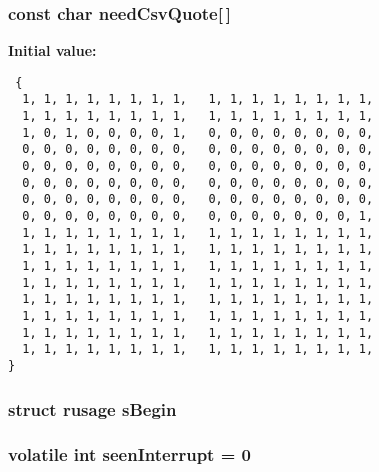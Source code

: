 \subsubsection{\setlength{\rightskip}{0pt plus 5cm}const char \bf{need\-Csv\-Quote}[$\,$]\hspace{0.3cm}{\tt  [static]}}\label{3_87_83_2shell_8c_2bf82b89bb4c95c96d328b320447072c}


\textbf{Initial value:}

\begin{Code}\begin{verbatim} {
  1, 1, 1, 1, 1, 1, 1, 1,   1, 1, 1, 1, 1, 1, 1, 1,   
  1, 1, 1, 1, 1, 1, 1, 1,   1, 1, 1, 1, 1, 1, 1, 1,   
  1, 0, 1, 0, 0, 0, 0, 1,   0, 0, 0, 0, 0, 0, 0, 0, 
  0, 0, 0, 0, 0, 0, 0, 0,   0, 0, 0, 0, 0, 0, 0, 0, 
  0, 0, 0, 0, 0, 0, 0, 0,   0, 0, 0, 0, 0, 0, 0, 0, 
  0, 0, 0, 0, 0, 0, 0, 0,   0, 0, 0, 0, 0, 0, 0, 0, 
  0, 0, 0, 0, 0, 0, 0, 0,   0, 0, 0, 0, 0, 0, 0, 0, 
  0, 0, 0, 0, 0, 0, 0, 0,   0, 0, 0, 0, 0, 0, 0, 1, 
  1, 1, 1, 1, 1, 1, 1, 1,   1, 1, 1, 1, 1, 1, 1, 1,   
  1, 1, 1, 1, 1, 1, 1, 1,   1, 1, 1, 1, 1, 1, 1, 1,   
  1, 1, 1, 1, 1, 1, 1, 1,   1, 1, 1, 1, 1, 1, 1, 1,   
  1, 1, 1, 1, 1, 1, 1, 1,   1, 1, 1, 1, 1, 1, 1, 1,   
  1, 1, 1, 1, 1, 1, 1, 1,   1, 1, 1, 1, 1, 1, 1, 1,   
  1, 1, 1, 1, 1, 1, 1, 1,   1, 1, 1, 1, 1, 1, 1, 1,   
  1, 1, 1, 1, 1, 1, 1, 1,   1, 1, 1, 1, 1, 1, 1, 1,   
  1, 1, 1, 1, 1, 1, 1, 1,   1, 1, 1, 1, 1, 1, 1, 1,   
}
\end{verbatim}\end{Code}
\subsubsection{\setlength{\rightskip}{0pt plus 5cm}struct rusage \bf{s\-Begin}\hspace{0.3cm}{\tt  [static]}}\label{3_87_83_2shell_8c_6ec49c758c9d39def0d62e135b63a89a}


\subsubsection{\setlength{\rightskip}{0pt plus 5cm}volatile int \bf{seen\-Interrupt} = 0\hspace{0.3cm}{\tt  [static]}}\label{3_87_83_2shell_8c_7cbb56b0354cec0829c2ea1fe7a5a3d7}


